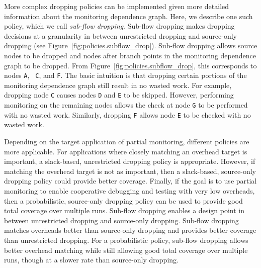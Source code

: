 More complex dropping policies can be implemented given more detailed
information about the monitoring dependence graph. Here, we describe one such
policy, which we call \emph{sub-flow dropping}. Sub-flow dropping makes
dropping decisions at a granularity in between unrestricted dropping and
source-only dropping (see Figure~\ref{fig:policies.subflow_drop}). Sub-flow
dropping allows source nodes to be dropped and nodes after branch points in the
monitoring dependence graph to be dropped. From
Figure~\ref{fig:policies.subflow_drop}, this corresponds to nodes {\tt A}, {\tt
C}, and {\tt F}. The basic intuition is that dropping certain portions of the
monitoring dependence graph still result in no wasted work. For example,
dropping node {\tt C} causes nodes {\tt D} and {\tt E} to be skipped. However,
performing monitoring on the remaining nodes allows the check at node {\tt G}
to be performed with no wasted work. Similarly, dropping {\tt F} allows node
{\tt E} to be checked with no wasted work.

Depending on the target application of partial monitoring, different policies
are more applicable.
For applications where closely matching an overhead target is important, a
slack-based, unrestricted dropping policy is appropriate. However, if matching
the overhead target is not as important, then a slack-based, source-only dropping
policy could provide better coverage. 
Finally, if the goal is to use partial monitoring to enable cooperative
debugging and testing with very low overheads, then a probabilistic,
source-only dropping policy can be used to provide good total coverage over
multiple runs.
Sub-flow dropping enables a design point in between unrestricted dropping and
source-only dropping. Sub-flow dropping matches overheads better than
source-only dropping and provides better coverage than unrestricted dropping.
For a probabilistic policy, sub-flow dropping allows better overhead matching
while still allowing good total coverage over multiple runs, though at a slower
rate than source-only dropping.

